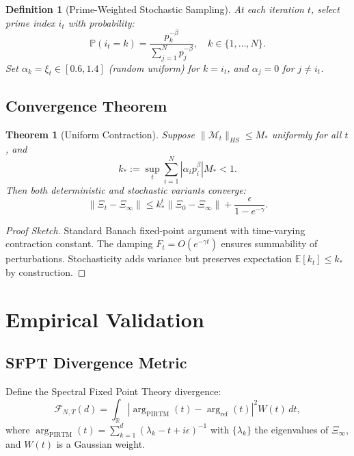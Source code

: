 \documentclass[11pt]{article}
\newtheorem{theorem}{Theorem}
\newtheorem{definition}{Definition}
\begin{document}
\begin{definition}[Prime-Weighted Stochastic Sampling]
At each iteration $t$, select prime index $i_t$ with probability:
\begin{equation}
\mathbb{P}(i_t = k) = \frac{p_k^{-\beta}}{\sum_{j=1}^N p_j^{-\beta}}, \quad k \in \{1, \ldots, N\}.
\end{equation}
Set $\alpha_k = \xi_t \in [0.6, 1.4]$ (random uniform) for $k = i_t$, and $\alpha_j = 0$ for $j \neq i_t$.
\end{definition}

\subsection{Convergence Theorem}

\begin{theorem}[Uniform Contraction]
Suppose $\|\mathcal{M}_t\|_{HS} \leq M_*$ uniformly for all $t$, and 
\begin{equation}
k_* := \sup_t \sum_{i=1}^N |\alpha_i p_i^{\beta}| M_* < 1.
\end{equation}
Then both deterministic and stochastic variants converge:
\begin{equation}
\|\Xi_t - \Xi_\infty\| \leq k_*^t \|\Xi_0 - \Xi_\infty\| + \frac{\epsilon}{1 - e^{-\gamma}}.
\end{equation}
\end{theorem}

\begin{proof}[Proof Sketch]
Standard Banach fixed-point argument with time-varying contraction constant. The damping $F_t = O(e^{-\gamma t})$ ensures summability of perturbations. Stochasticity adds variance but preserves expectation $\mathbb{E}[k_t] \leq k_*$ by construction.
\end{proof}

\section{Empirical Validation}

\subsection{SFPT Divergence Metric}

Define the Spectral Fixed Point Theory divergence:
\begin{equation}
\mathcal{F}_{N,T}(d) = \int_{\mathbb{R}} \left| \arg_{\text{PIRTM}}(t) - \arg_{\text{ref}}(t) \right|^2 W(t) \, dt,
\end{equation}
where $\arg_{\text{PIRTM}}(t) = \sum_{k=1}^d (\lambda_k - t + i\epsilon)^{-1}$ with $\{\lambda_k\}$ the eigenvalues of $\Xi_\infty$, and $W(t)$ is a Gaussian weight.
\end{document}
